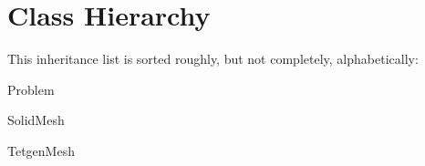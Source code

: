 \section{Class Hierarchy}
This inheritance list is sorted roughly, but not completely, alphabetically\+:\begin{DoxyCompactList}
\item Problem\begin{DoxyCompactList}
\item {}
\end{DoxyCompactList}
\item Solid\+Mesh\begin{DoxyCompactList}
\item {}
\end{DoxyCompactList}
\item Tetgen\+Mesh\begin{DoxyCompactList}
\item {}
\end{DoxyCompactList}
\end{DoxyCompactList}
